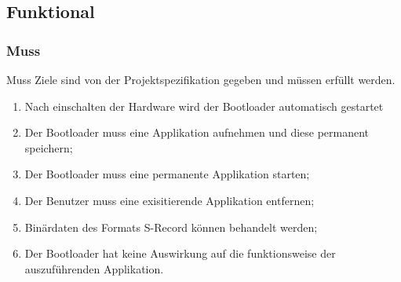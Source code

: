 \documentclass[letterpaper,10pt,ngerman]{manual}
\begin{document}
\subsection{Funktional}


\subsubsection{Muss}

Muss Ziele sind von der Projektspezifikation gegeben und müssen erfüllt werden.
\begin{enumerate}
\item {} 
Nach einschalten der Hardware wird der Bootloader automatisch gestartet

\item {} 
Der Bootloader muss eine Applikation aufnehmen und diese permanent speichern;

\item {} 
Der Bootloader muss eine permanente Applikation starten;

\item {} 
Der Benutzer muss eine exisitierende Applikation entfernen;

\item {} 
Binärdaten des Formats S-Record können behandelt werden;

\item {} 
Der Bootloader hat keine Auswirkung auf die funktionsweise der auszuführenden Applikation.

\end{enumerate}
\end{document}
